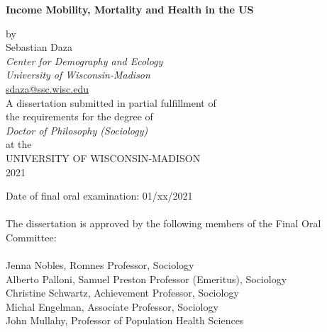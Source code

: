 \documentclass[12pt]{report}
\begin{document}

\thispagestyle{empty}

\renewcommand{\baselinestretch}{1}

\vspace*{60pt}

\begin{center}
\LARGE \textbf{Income Mobility, Mortality and Health in the US} \\
\vspace*{24pt}


\end{center}

\begin{center}
\normalsize
by \\
\vspace*{12pt}
Sebastian Daza \\
\textit{Center for Demography and Ecology \\University of Wisconsin-Madison}\\
\url{sdaza@ssc.wisc.edu}\\
\vspace*{40pt}
A dissertation submitted in partial fulfillment of \\
the requirements for the degree of\\
\vspace{12pt}
\textit{Doctor of Philosophy (Sociology)} \\
\vspace{12pt}
at the \\
\vspace{12pt}
UNIVERSITY OF WISCONSIN‐MADISON \\
\vspace{12pt}
2021
\end{center}

\vspace{60pt}
\noindent Date of final oral examination: 01/xx/2021\\
\\
\noindent The dissertation is approved by the following members of the Final Oral Committee:\\
\\
\noindent Jenna Nobles, Romnes Professor, Sociology \\
\noindent Alberto Palloni, Samuel Preston Professor (Emeritus), Sociology\\
\noindent Christine Schwartz, Achievement Professor, Sociology\\
\noindent Michal Engelman, Associate Professor, Sociology \\
\noindent John Mullahy, Professor of Population Health Sciences
\end{document}
